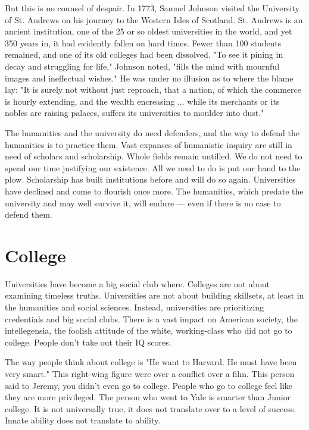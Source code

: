 \documentclass[12pt,letterpaper]{article}
\begin{document}
But this is no counsel of despair. In 1773, Samuel Johnson visited the University of St. Andrews on his journey to the Western Isles of Scotland. St. Andrews is an ancient institution, one of the 25 or so oldest universities in the world, and yet 350 years in, it had evidently fallen on hard times. Fewer than 100 students remained, and one of its old colleges had been dissolved. "To see it pining in decay and struggling for life," Johnson noted, "fills the mind with mournful images and ineffectual wishes." He was under no illusion as to where the blame lay: "It is surely not without just reproach, that a nation, of which the commerce is hourly extending, and the wealth encreasing ... while its merchants or its nobles are raising palaces, suffers its universities to moulder into dust."

The humanities and the university do need defenders, and the way to defend the humanities is to practice them. Vast expanses of humanistic inquiry are still in need of scholars and scholarship. Whole fields remain untilled. We do not need to spend our time justifying our existence. All we need to do is put our hand to the plow. Scholarship has built institutions before and will do so again. Universities have declined and come to flourish once more. The humanities, which predate the university and may well survive it, will endure — even if there is no case to defend them.



\section{College}
Universities have become a big social club where.  Colleges are not about examining timeless truths.  Universities are not about building skillsets, at least in the humanities and social sciences.  Instead, universities are prioritizing credentials and big social clubs.  There is a vast impact on American society, the intellegensia, the foolish attitude of the white, working-class who did not go to college.  People don't take out their IQ scores.

The way people think about college is "He want to Harvard.  He must have been very smart."  This right-wing figure were over a conflict over a film.  This person said to Jeremy, you didn't even go to college.  People who go to college feel like they are more privileged.  The person who went to Yale is smarter than Junior college.  It is not universally true, it does not translate over to a level of success.  Innate ability does not translate to ability.
\end{document}

